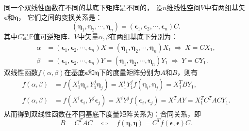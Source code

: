 同一个双线性函数在不同的基底下矩阵是不同的，
设$n$维线性空间$V$中有两组基矢$\boldsymbol{\epsilon}$和$\boldsymbol{\eta}$，
它们之间的变换关系是：
\begin{equation}
    \left(\boldsymbol{\eta}_1,\boldsymbol{\eta}_2,\cdots,\boldsymbol{\eta}_n\right) =
    \left(\boldsymbol{\epsilon}_1,\boldsymbol{\epsilon}_2,\cdots,\boldsymbol{\epsilon}_n\right)C.
\end{equation}
其中$C$是$\mathbb{F}$值可逆矩阵．$V$中矢量$\alpha,\beta$在两组基底下分别为：
\begin{align*}
    \alpha&=\left(\boldsymbol{\epsilon}_1,\boldsymbol{\epsilon}_2,\cdots,\boldsymbol{\epsilon}_n\right)X =
    \left(\boldsymbol{\eta}_1,\boldsymbol{\eta}_2,\cdots,\boldsymbol{\eta}_n\right)X_1
    {\ \Rightarrow \  } X = C X_1 ,\\
    \beta &=\left(\boldsymbol{\epsilon}_1,\boldsymbol{\epsilon}_2,\cdots,\boldsymbol{\epsilon}_n\right)Y =
    \left(\boldsymbol{\eta}_1,\boldsymbol{\eta}_2,\cdots,\boldsymbol{\eta}_n\right)Y_1
    {\ \Rightarrow\  } Y = C Y_1 .
\end{align*}
双线性函数$f(\alpha,\beta)$在基底$\boldsymbol{\epsilon}$和$\boldsymbol{\eta}$下的度量矩阵分别为$A$和$B$，则有
\begin{align*}
    f(\alpha,\beta)  &= f\left( X_{1}^i \boldsymbol{\eta}_i, Y_{1}^j \boldsymbol{\eta}_j\right)
    = X_{1}^i Y_{1}^j f\left(  \boldsymbol{\eta}_i, \boldsymbol{\eta}_j\right) = X_1^T B Y_1,  \\
    f(\alpha,\beta)  &= f\left( X^{i} \boldsymbol{\epsilon}_i, Y^{j} \boldsymbol{\epsilon}_j\right)
    = X^{i} Y^{j} f\left(  \boldsymbol{\epsilon}_i, \boldsymbol{\epsilon}_j\right)
    = X^T A Y = X_1^T C^T A C Y_1 .
\end{align*}
从而得到双线性函数在不同基底下度量矩阵关系为：合同关系，即
\begin{equation}\label{chmla:eqn_congruent}
    B = C^T A C {\quad \Longleftrightarrow \quad}
    f\left(  \boldsymbol{\eta}, \boldsymbol{\eta}\right) =
    C^T f\left(  \boldsymbol{\epsilon}, \boldsymbol{\epsilon}\right) C.
\end{equation}


